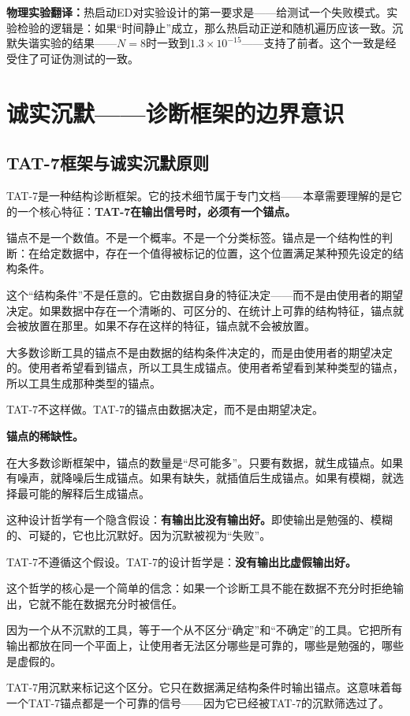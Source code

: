 \documentclass[11pt,a4paper]{book}
\theoremstyle{definition}
\begin{document}
\textbf{物理实验翻译：}热启动ED对实验设计的第一要求是——给测试一个失败模式。实验检验的逻辑是：如果“时间静止”成立，那么热启动正逆和随机遍历应该一致。沉默失谐实验的结果——$N=8$时一致到$1.3\times10^{-15}$——支持了前者。这个一致是经受住了可证伪测试的一致。

\chapter{诚实沉默——诊断框架的边界意识}

\section{TAT-7框架与诚实沉默原则}

TAT-7是一种结构诊断框架。它的技术细节属于专门文档——本章需要理解的是它的一个核心特征：\textbf{TAT-7在输出信号时，必须有一个锚点。}

锚点不是一个数值。不是一个概率。不是一个分类标签。锚点是一个结构性的判断：在给定数据中，存在一个值得被标记的位置，这个位置满足某种预先设定的结构条件。

这个“结构条件”不是任意的。它由数据自身的特征决定——而不是由使用者的期望决定。如果数据中存在一个清晰的、可区分的、在统计上可靠的结构特征，锚点就会被放置在那里。如果不存在这样的特征，锚点就不会被放置。

大多数诊断工具的锚点不是由数据的结构条件决定的，而是由使用者的期望决定的。使用者希望看到锚点，所以工具生成锚点。使用者希望看到某种类型的锚点，所以工具生成那种类型的锚点。

TAT-7不这样做。TAT-7的锚点由数据决定，而不是由期望决定。

\textbf{锚点的稀缺性。}

在大多数诊断框架中，锚点的数量是“尽可能多”。只要有数据，就生成锚点。如果有噪声，就降噪后生成锚点。如果有缺失，就插值后生成锚点。如果有模糊，就选择最可能的解释后生成锚点。

这种设计哲学有一个隐含假设：\textbf{有输出比没有输出好。}即使输出是勉强的、模糊的、可疑的，它也比沉默好。因为沉默被视为“失败”。

TAT-7不遵循这个假设。TAT-7的设计哲学是：\textbf{没有输出比虚假输出好。}

这个哲学的核心是一个简单的信念：如果一个诊断工具不能在数据不充分时拒绝输出，它就不能在数据充分时被信任。

因为一个从不沉默的工具，等于一个从不区分“确定”和“不确定”的工具。它把所有输出都放在同一个平面上，让使用者无法区分哪些是可靠的，哪些是勉强的，哪些是虚假的。

TAT-7用沉默来标记这个区分。它只在数据满足结构条件时输出锚点。这意味着每一个TAT-7锚点都是一个可靠的信号——因为它已经被TAT-7的沉默筛选过了。
\end{document}
